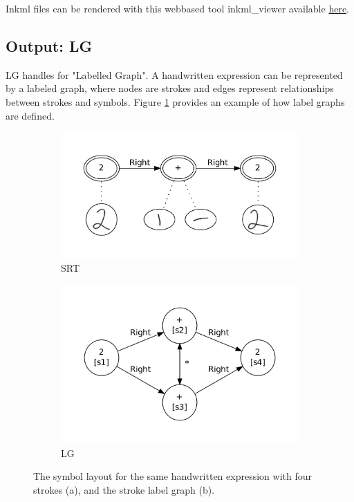 \documentclass{article}
\begin{document}
Inkml files can be rendered with this webbased tool inkml\_viewer available  \href{https://uncloud.univ-nantes.fr/index.php/s/OdAtErZgxKGjsNy}{here}.

\subsection{Output: LG}
LG handles for "Labelled Graph". A handwritten expression can be represented by a labeled graph, where nodes are strokes and edges represent relationships between strokes and symbols. Figure \ref{figLG} provides an example of how label graphs are defined.

\begin{figure}
\begin{subfigure}{0.45\linewidth}
\includegraphics[width=\linewidth]{twolevel.png}
\caption{SRT}
\end{subfigure}
\begin{subfigure}{0.45\linewidth}
\includegraphics[width=\linewidth]{layout_lg.png}
\caption{LG}
\end{subfigure}
\caption{The symbol layout for the same handwritten expression with four strokes (a), and the stroke label graph (b).
\label{figLG}}
\end{figure}
\end{document}
